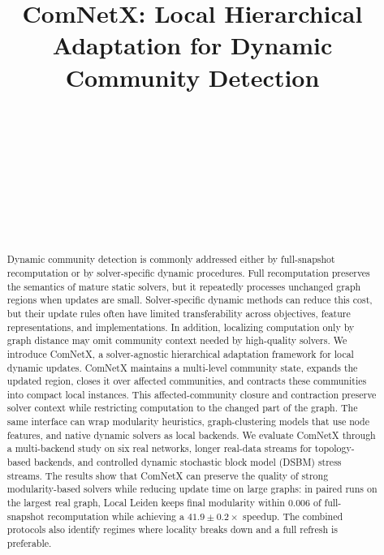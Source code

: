 \documentclass[conference]{IEEEtran}
\theoremstyle{definition}
\begin{document}
\title{ComNetX: Local Hierarchical Adaptation for Dynamic Community Detection}

\author{
 \\

\and
{}
 \\

\and
{}
 \\

\and
{}
 \\

\and
{}
 \\
}

\maketitle

\begin{abstract}
Dynamic community detection is commonly addressed either by full-snapshot
recomputation or by solver-specific dynamic procedures. Full recomputation
preserves the semantics of mature static solvers, but it repeatedly processes
unchanged graph regions when updates are small. Solver-specific dynamic methods
can reduce this cost, but their update rules often have limited transferability
across objectives, feature representations, and implementations. In addition,
localizing computation only by graph distance may omit community context needed
by high-quality solvers. We introduce ComNetX, a solver-agnostic hierarchical
adaptation framework for local dynamic updates. ComNetX maintains a multi-level
community state, expands the updated region, closes it over affected
communities, and contracts these communities into compact local instances. This
affected-community closure and contraction preserve solver context while
restricting computation to the changed part of the graph. The same interface can
wrap modularity heuristics, graph-clustering models that use node features, and
native dynamic solvers as local backends. We evaluate ComNetX through a
multi-backend study on six real networks, longer real-data streams for
topology-based backends, and controlled dynamic stochastic block model (DSBM)
stress streams. The results show that ComNetX can preserve the quality of strong
modularity-based solvers while reducing update time on large graphs: in paired
runs on the largest real graph, Local Leiden keeps final modularity within
0.006 of full-snapshot recomputation while achieving a $41.9\pm0.2\times$
speedup. The combined protocols also identify regimes where locality breaks
down and a full refresh is preferable.
\end{abstract}
\end{document}
